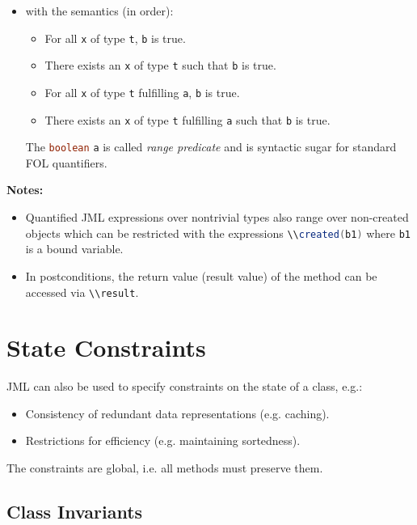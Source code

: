 \documentclass[a4paper, 11pt, accentcolor = tud3b]{tudreport}
\newcommand{\inlineJava}[1]{\lstinline[language = Java]|#1|}
\begin{document}
			\begin{itemize}
				\item[] with the semantics (in order):
					\begin{itemize}
						\item For all \texttt{x} of type \texttt{t}, \texttt{b} is true.
						\item There exists an \texttt{x} of type \texttt{t} such that \texttt{b} is true.
						\item For all \texttt{x} of type \texttt{t} fulfilling \texttt{a}, \texttt{b} is true.
						\item There exists an \texttt{x} of type \texttt{t} fulfilling \texttt{a} such that \texttt{b} is true.
					\end{itemize}
					The \inlineJava{boolean} \texttt{a} is called \textit{range predicate} and is syntactic sugar for standard FOL quantifiers.
			\end{itemize}
		
			\textbf{Notes:}
			\begin{itemize}
				\item Quantified JML expressions over nontrivial types also range over non-created objects which can be restricted with the expressions \inlineJava{\\created(b1)} where \texttt{b1} is a bound variable.
				\item In postconditions, the return value (result value) of the method can be accessed via \inlineJava{\\result}.
			\end{itemize}

		\section{State Constraints}
			JML can also be used to specify constraints on the state of a class, e.g.:
			\begin{itemize}
				\item Consistency of redundant data representations (e.g. caching).
				\item Restrictions for efficiency (e.g. maintaining sortedness).
			\end{itemize}
			The constraints are global, i.e. all methods must preserve them.

			\subsection{Class Invariants}
				\label{sec:classinv}
			
\end{document}
